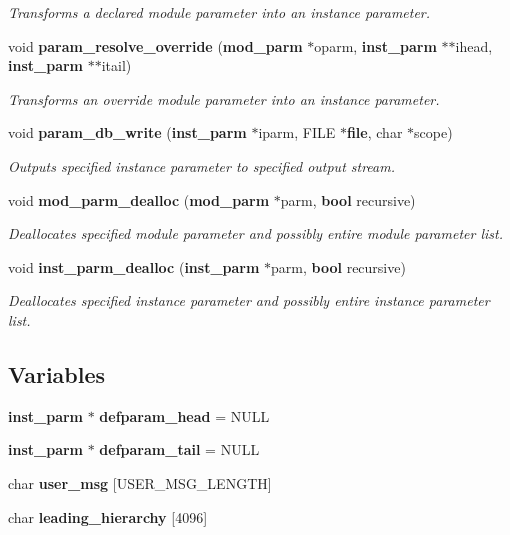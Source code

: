 \begin{CompactItemize}
\begin{CompactList}\small\item\em Transforms a declared module parameter into an instance parameter. \item\end{CompactList}\item 
void {\bf param\_\-resolve\_\-override} ({\bf mod\_\-parm} $\ast$oparm, {\bf inst\_\-parm} $\ast$$\ast$ihead, {\bf inst\_\-parm} $\ast$$\ast$itail)
\begin{CompactList}\small\item\em Transforms an override module parameter into an instance parameter. \item\end{CompactList}\item 
void {\bf param\_\-db\_\-write} ({\bf inst\_\-parm} $\ast$iparm, FILE $\ast${\bf file}, char $\ast$scope)
\begin{CompactList}\small\item\em Outputs specified instance parameter to specified output stream. \item\end{CompactList}\item 
void {\bf mod\_\-parm\_\-dealloc} ({\bf mod\_\-parm} $\ast$parm, {\bf bool} recursive)
\begin{CompactList}\small\item\em Deallocates specified module parameter and possibly entire module parameter list. \item\end{CompactList}\item 
void {\bf inst\_\-parm\_\-dealloc} ({\bf inst\_\-parm} $\ast$parm, {\bf bool} recursive)
\begin{CompactList}\small\item\em Deallocates specified instance parameter and possibly entire instance parameter list. \item\end{CompactList}\end{CompactItemize}
\subsection*{Variables}
\begin{CompactItemize}
\item 
{\bf inst\_\-parm} $\ast$ {\bf defparam\_\-head} = NULL
\item 
{\bf inst\_\-parm} $\ast$ {\bf defparam\_\-tail} = NULL
\item 
char {\bf user\_\-msg} [USER\_\-MSG\_\-LENGTH]
\item 
char {\bf leading\_\-hierarchy} [4096]
\end{CompactItemize}


